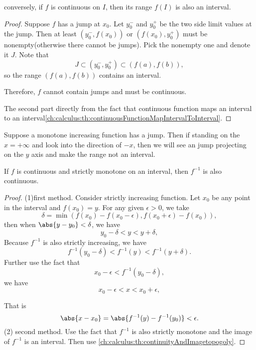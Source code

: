\begin{refsection}
\begin{lemma}
conversely, if $f$ is continuous on $I$, then its range $f(I)$ is also an interval.	
\end{lemma}
\begin{proof}
Suppose $f$ has a jump at $x_0$. Let $y_0^-$ and $y_0^+$ be the two side limit values at the jump. 
Then at least $(y_0^-, f(x_0))$ or $(f(x_0),y_0^+)$ must be nonempty(otherwise there cannot be jumps). Pick the nonempty one and denote it $J$. Note that
$$J\subset (y_0^-,y_0^+)\subset (f(a),f(b)),$$
so the range $(f(a),f(b))$ contains an interval.	

Therefore, $f$ cannot contain jumps and must be continuous.


The second part directly from the fact that continuous function maps an interval to an interval\autoref{ch:calculus:th:continuousFunctionMapIntervalToInterval}.
\end{proof}

\begin{remark}
Suppose a monotone increasing function has a jump. Then if standing on the $x=+\infty$ and look into the direction of $-x$, then we will see an jump projecting on the $y$ axis and make the range not an interval.	
\end{remark}


\begin{lemma}\label{ch:calculus:th:continuityOfInversefunctions}
	If $f$ is continuous and strictly monotone on an interval, then $f^{-1}$ is also continuous.	
\end{lemma}
\begin{proof}
(1)first method.	Consider strictly increasing function. Let $x_0$ be any point in the interval and $f(x_0) = y$. For any given $\epsilon > 0$, we take
	$$\delta = \min(f(x_0) - f(x_0-\epsilon),f(x_0+\epsilon)-f(x_0)),$$
	then when $\abs{y - y_0} < \delta$, we have
	$$y_0 - \delta < y < y + \delta,$$
	Because $f^{-1}$ is also strictly increasing, we have
	$$f^{-1}(y_0 - \delta) < f^{-1}(y) < f^{-1}(y + \delta).$$
	Further use the fact that
	$$x_0 - \epsilon < f^{-1}(y_0 - \delta),$$
	we have
	$$x_0 - \epsilon < x < x_0 + \epsilon, $$
	
	That is
	$$\abs{x-x_0} = \abs{f^{-1}(y) - f^{-1}(y_0)} < \epsilon.$$
(2) second method. Use the fact that $f^{-1}$ is also strictly monotone and the image of $f^{-1}$ is an interval. Then use \autoref{ch:calculus:th:continuityAndImagetopogoly}. 	
\end{proof}


\end{refsection}
